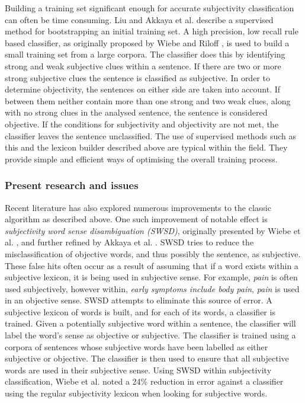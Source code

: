 Building a training set significant enough for accurate subjectivity classification can often be time consuming. Liu \cite{Liu:2010tm} and Akkaya et al. \cite{Akkaya:2009ww} describe a supervised method for bootstrapping an initial training set. A high precision, low recall rule based classifier, as originally proposed by Wiebe and Riloff \cite{Wiebe:2003wa}, is used to build a small training set from a large corpora. The classifier does this by identifying strong and weak subjective clues within a sentence. If there are two or more strong subjective clues the sentence is classified as subjective. In order to determine objectivity, the sentences on either side are taken into account. If between them neither contain more than one strong and two weak clues, along with no strong clues in the analysed sentence, the sentence is considered objective. If the conditions for subjectivity and objectivity are not met, the classifier leaves the sentence unclassified. The use of supervised methods such as this and the lexicon builder described above are typical within the field. They provide simple and efficient ways of optimising the overall training process.

\subsubsection{Present research and issues}

Recent literature has also explored numerous improvements to the classic algorithm as described above. One such improvement of notable effect is \emph{subjectivity word sense disambiguation (SWSD)}, originally presented by Wiebe et al. \cite{Wiebe:2006te}, and further refined by Akkaya et al. \cite{Akkaya:2009ww}. SWSD tries to reduce the misclassification of objective words, and thus possibly the sentence, as subjective. These false hits often occur as a result of assuming that if a word exists within a subjective lexicon, it is being used in subjective sense. For example, \emph{pain} is often used subjectively, however within, \emph{early symptoms include body pain}, \emph{pain} is used in an objective sense. SWSD attempts to eliminate this source of error. A subjective lexicon of words is built, and for each of its words, a classifier is trained. Given a potentially subjective word within a sentence, the classifier will label the word's sense as objective or subjective. The classifier is trained using a corpora of sentences whose subjective words have been labelled as either subjective or objective. The classifier is then used to ensure that all subjective words are used in their subjective sense. Using SWSD within subjectivity classification, Wiebe et al. \cite{Akkaya:2009ww} noted a 24\% reduction in error against a classifier using the regular subjectivity lexicon when looking for subjective words. 

